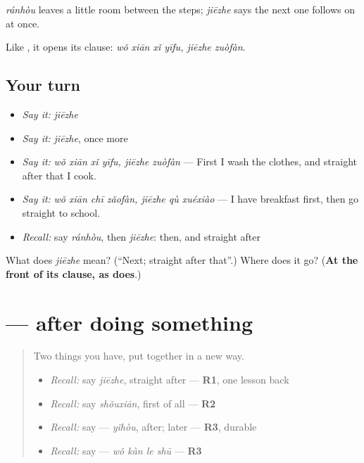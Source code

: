 \begin{grammarlens}[title={What you've built}]
\emph{ránhòu} leaves a little room between the steps; \emph{jiēzhe} says the next one follows on at once.

Like , it opens its clause: \emph{wǒ xiān xǐ yīfu, jiēzhe zuòfàn}.
\end{grammarlens}

\subsection*{Your turn}
\begin{itemize}
\raggedright
  \item \emph{Say it:} \emph{jiēzhe}
  \item \emph{Say it:} \emph{jiēzhe}, once more
  \item \emph{Say it:} \emph{wǒ xiān xǐ yīfu, jiēzhe zuòfàn} — First I wash the clothes, and straight after that I cook.
  \item \emph{Say it:} \emph{wǒ xiān chī zǎofàn, jiēzhe qù xuéxiào} — I have breakfast first, then go straight to school.
  \item \emph{Recall:} say \emph{ránhòu}, then \emph{jiēzhe}: then, and straight after
\end{itemize}

\begin{tcolorbox}[breakable,colback=teal!4,colframe=teal!35!black,title={Before you move on}]
What does \emph{jiēzhe} mean? (\textquotedblleft{}Next; straight after that\textquotedblright{}.) Where does it go? (\textbf{At the front of its clause, as  does}.)
\end{tcolorbox}
\section[\texorpdfstring{\zh{吃了饭以后} (chī le fàn yǐhòu)}{吃了饭以后 (chī le fàn yǐhòu)}]{ — after doing something}

\label{lesson:ZH-C278-le-yihou}



\begin{quote}
Two things you have, put together in a new way.

\begin{itemize}
\raggedright
  \item \emph{Recall:} say \emph{jiēzhe}, straight after — \textbf{R1}, one lesson back
  \item \emph{Recall:} say \emph{shǒuxiān}, first of all — \textbf{R2}
  \item \emph{Recall:} say  — \emph{yǐhòu}, after; later — \textbf{R3}, durable
  \item \emph{Recall:} say  — \emph{wǒ kàn le shū} — \textbf{R3}
\end{itemize}
\end{quote}


